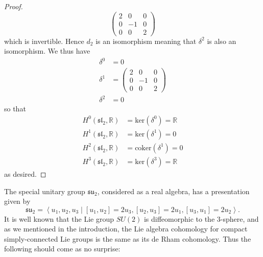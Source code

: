 \begin{proof}
\begin{equation}
\begin{pmatrix}
      2 & 0 & 0 \\
      0 & -1 & 0 \\
      0 & 0 & 2
    \end{pmatrix}
  \end{equation}
  which is invertible. Hence $ d_2 $ is an isomorphism meaning that $ \delta^{2} $ is also an isomorphism. We thus have
  \begin{align*}
    \delta^0 &= 0 \\
    \delta^1 &= \begin{pmatrix}
      2 & 0 & 0 \\
      0 & -1 & 0 \\
      0 & 0 & 2
    \end{pmatrix} \\
      \delta^2 &= 0
  \end{align*}
  so that
  \begin{align*}
    H^{0}(\mathfrak{sl}_2,\mathbb{R}) &= \text{ker}(\delta^0) =\mathbb{R} \\
    H^{1}(\mathfrak{sl}_2,\mathbb{R}) &= \text{ker}(\delta^1) = 0 \\
    H^2(\mathfrak{sl}_2,\mathbb{R}) &= \text{coker}(\delta^1) = 0 \\
    H^3(\mathfrak{sl}_2,\mathbb{R}) &= \text{ker}(\delta^3) =\mathbb{R}
  \end{align*}
  as desired.
\end{proof}
The special unitary group $ \mathfrak{su}_2 $, considered as a real algebra, has a presentation given by
\begin{equation}
  \mathfrak{su}_2 = \left\langle u_1,u_2,u_3 \mid [u_1, u_2] = 2u_3, [u_2, u_3] = 2u_1, [u_3, u_1] = 2u_2 \right\rangle.
\end{equation}
It is well known that the Lie group $ SU(2) $ is diffeomorphic to the 3-sphere, and as we mentioned in the introduction, the Lie algebra cohomology for compact simply-connected Lie groups is the same as its de Rham cohomology. Thus the following should come as no surprise:

